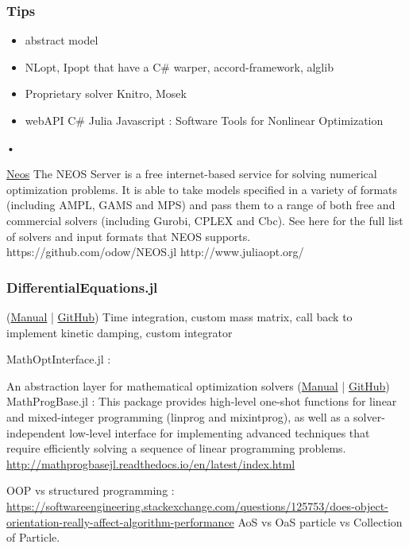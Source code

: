 \subsubsection{Tips}

\begin{itemize}
\item abstract model
\item NLopt, Ipopt that have a C\# warper, accord-framework, alglib
\item Proprietary solver Knitro, Mosek
\item webAPI C\# Julia Javascript
\cite{Moulard2014} : Software Tools for Nonlinear Optimization
\end{itemize}•

\href{https://neos-guide.org/}{Neos}
The NEOS Server is a free internet-based service for solving numerical optimization problems. It is able to take models specified in a variety of formats (including AMPL, GAMS and MPS) and pass them to a range of both free and commercial solvers (including Gurobi, CPLEX and Cbc). See here for the full list of solvers and input formats that NEOS supports.
https://github.com/odow/NEOS.jl
http://www.juliaopt.org/

\subsubsection{DifferentialEquations.jl}
(\href{http://docs.juliadiffeq.org/latest/index.html}{Manual} | \href{https://github.com/JuliaDiffEq}{GitHub})
Time integration, custom mass matrix, call back to implement kinetic damping, custom integrator

MathOptInterface.jl :

An abstraction layer for mathematical optimization solvers (\href{http://www.juliaopt.org/MathOptInterface.jl/latest/apimanual.html}{Manual} | \href{https://github.com/JuliaOpt/MathOptInterface.jl}{GitHub})
MathProgBase.jl : 
This package provides high-level one-shot functions for linear and mixed-integer programming (linprog and mixintprog), as well as a solver-independent low-level interface for implementing advanced techniques that require efficiently solving a sequence of linear programming problems.
\url{http://mathprogbasejl.readthedocs.io/en/latest/index.html}

OOP vs structured programming : \url{https://softwareengineering.stackexchange.com/questions/125753/does-object-orientation-really-affect-algorithm-performance}
AoS vs OaS particle vs Collection of Particle.


